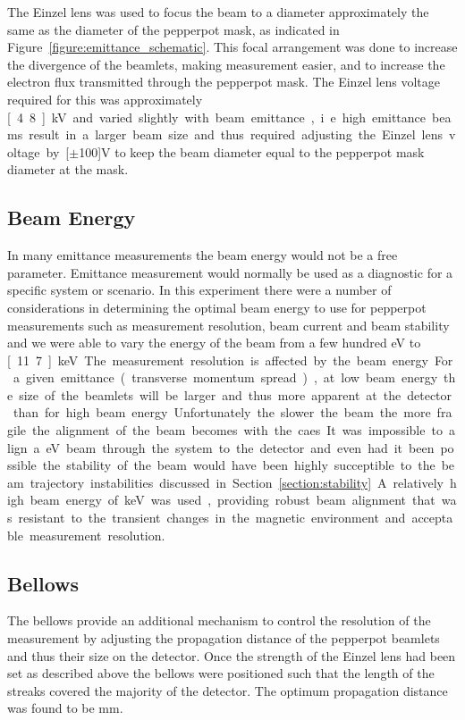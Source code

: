 The Einzel lens was used to focus the beam to a diameter approximately the same as the diameter of the pepperpot mask, as indicated in Figure~\ref{figure:emittance_schematic}.
This focal arrangement was done to increase the divergence of the beamlets, making measurement easier, and to increase the electron flux transmitted through the pepperpot mask.
The Einzel lens voltage required for this was approximately \unit[4.8]{kV} and varied slightly with beam emittance, i.e. high emittance beams result in a larger beam size and thus required adjusting the Einzel lens voltage by \unit[$\pm$100]{V} to keep the beam diameter equal to the pepperpot mask diameter at the mask.

\subsection{Beam Energy}
In many emittance measurements the beam energy would not be a free parameter.
Emittance measurement would normally be used as a diagnostic for a specific system or scenario.
In this experiment there were a number of considerations in determining the optimal beam energy to use for pepperpot measurements such as measurement resolution, beam current and beam stability and we were able to vary the energy of the beam from a few hundred eV to \unit[11.7]{keV}.


The measurement resolution is affected by the beam energy.
For a given emittance (transverse momentum spread), at low beam energy the size of the beamlets will be larger and thus more apparent at the detector than for high beam energy.
Unfortunately the slower the beam the more fragile the alignment of the beam becomes with the \gls{caes}.
It was impossible to align a \unit[500]{eV} beam through the system to the detector and even had it been possible the stability of the beam would have been highly succeptible to the beam trajectory instabilities discussed in Section~\ref{section:stability}.
A relatively high beam energy of \unit[8]{keV} was used, providing robust beam alignment that was resistant to the transient changes in the magnetic environment and acceptable measurement resolution.

\subsection{Bellows}

The bellows provide an additional mechanism to control the resolution of the measurement by adjusting the propagation distance of the pepperpot beamlets and thus their size on the detector.
Once the strength of the Einzel lens had been set as described above the bellows were positioned such that the length of the streaks covered the majority of the detector.
The optimum propagation distance was found to be \unit[475]{mm}.

